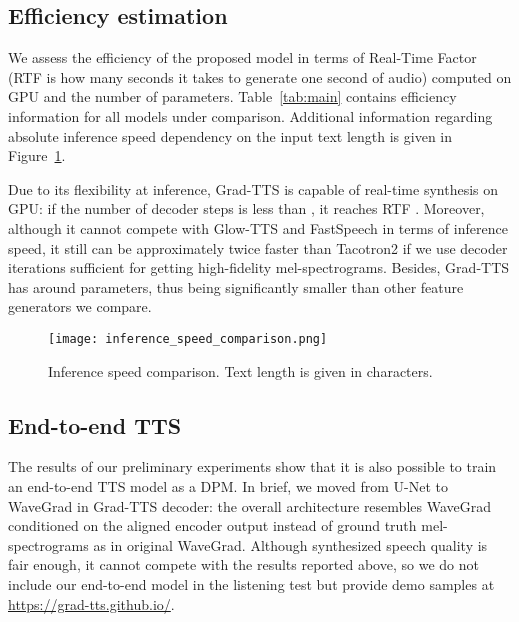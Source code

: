 \documentclass{article}
\begin{document}
\subsection{Efficiency estimation}
\label{subsec:efficiency}

We assess the efficiency of the proposed model in terms of Real-Time Factor (RTF is how many seconds it takes to generate one second of audio) computed on GPU and the number of parameters. Table~\ref{tab:main} contains efficiency information for all models under comparison.
Additional information regarding absolute inference speed dependency on the input text length is given in Figure~\ref{fig:speed}.

Due to its flexibility at inference, Grad-TTS is capable of real-time synthesis on GPU: if the number of decoder steps is less than , it reaches RTF . Moreover, although it cannot compete with Glow-TTS and FastSpeech in terms of inference speed, it still can be approximately twice faster than Tacotron2 if we use  decoder iterations sufficient for getting high-fidelity mel-spectrograms. Besides, Grad-TTS has around  parameters, thus being significantly smaller than other feature generators we compare.

\begin{figure}[!ht]
\vskip 0.1in
\begin{center}
\centerline{\texttt{[image: inference\_speed\_comparison.png]}}
\caption{Inference speed comparison. Text length is given in characters.}
\label{fig:speed}
\end{center}
\vskip -0.1in
\end{figure}

\subsection{End-to-end TTS}
\label{subsec:e2e}

The results of our preliminary experiments show that it is also possible to train an end-to-end TTS model as a DPM. In brief, we moved from U-Net to WaveGrad \cite{WaveGrad} in Grad-TTS decoder: the overall architecture resembles WaveGrad conditioned on the aligned encoder output  instead of ground truth mel-spectrograms  as in original WaveGrad. Although synthesized speech quality is fair enough, it cannot compete with the results reported above, so we do not include our end-to-end model in the listening test but provide demo samples at \url{https://grad-tts.github.io/}.
\end{document}

